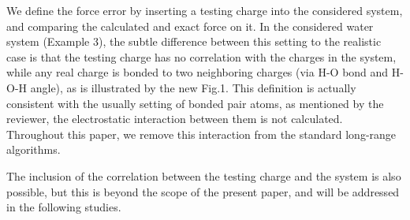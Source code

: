 \documentclass[a4paper]{article}
\begin{document}

We define the force error by inserting a testing charge into the
considered system, and comparing the calculated and exact force on
it. In the considered water system (Example 3), the subtle difference
between this setting to the realistic case is that the testing charge
has no correlation with the charges in the system, while any real
charge is bonded to two neighboring charges (via H-O bond and H-O-H
angle), as is illustrated by the new Fig.1.
This definition is actually consistent with the usually
setting of bonded pair atoms, as mentioned by the reviewer, the
electrostatic interaction between them is not calculated.
Throughout this paper, we remove this  interaction from the
standard long-range algorithms.


The inclusion of the correlation between the testing
charge and the system is also possible, but this is beyond the scope
of the present paper, and will be addressed in the following studies.\\

\end{document}
